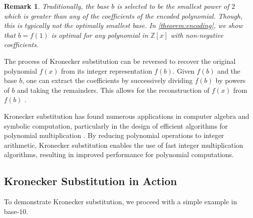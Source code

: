 \documentclass[11pt,reqno]{article}
\theoremstyle{plain}
\newtheorem{remark}{Remark}
\theoremstyle{definition}
\begin{document}
\begin{remark}
Traditionally, the base $b$ is selected to be the smallest power of $2$ which is greater than any of the coefficients of the encoded polynomial. Though, this is typically not the optimally smallest base. In \cref{theorem:encoding}, we show that $b=f(1)$ is optimal for any polynomial in $\mathbb{Z}[x]$ with non-negative coefficients.
\end{remark}

The process of Kronecker substitution can be reversed to recover the original polynomial $f(x)$ from its integer representation $f(b)$. Given $f(b)$ and the base $b$, one can extract the coefficients by successively dividing $f(b)$ by powers of $b$ and taking the remainders. This allows for the reconstruction of $f(x)$ from $f(b)$ \cite{grimaldi2004discrete}.

Kronecker substitution has found numerous applications in computer algebra and symbolic computation, particularly in the design of efficient algorithms for polynomial multiplication \cite{harvey2009kronecker, harvey2014faster}. By reducing polynomial operations to integer arithmetic, Kronecker substitution enables the use of fast integer multiplication algorithms, resulting in improved performance for polynomial computations.

\subsection{Kronecker Substitution in Action}
To demonstrate Kronecker substitution, we proceed with a simple example in base-$10$.
\end{document}

